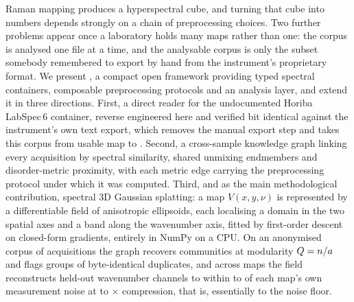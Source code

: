 Raman mapping produces a hyperspectral cube, and turning that cube into numbers
depends strongly on a chain of preprocessing choices. Two further problems
appear once a laboratory holds many maps rather than one: the corpus is
analysed one file at a time, and the analysable corpus is only the subset
somebody remembered to export by hand from the instrument's proprietary
format. We present \ramansp, a compact open framework providing typed spectral
containers, composable preprocessing protocols and an analysis layer, and
extend it in three directions. First, a direct reader for the undocumented
Horiba LabSpec\,6 container, reverse engineered here and verified bit identical
against the instrument's own text export, which removes the manual export step
and takes this corpus from \Nrawmaptext{} usable map to \Nrawmap.
Second, a cross-sample knowledge graph linking every acquisition by spectral
similarity, shared unmixing endmembers and disorder-metric proximity, with each
metric edge carrying the preprocessing protocol under which it was computed.
Third, and as the main methodological contribution, spectral 3D Gaussian
splatting: a map $V(x,y,\nu)$ is represented by a differentiable field of
anisotropic ellipsoids, each localising a domain in the two spatial axes and a
band along the wavenumber axis, fitted by first-order descent on closed-form
gradients, entirely in NumPy on a CPU. On an anonymised corpus of \Nacq{}
acquisitions the graph recovers \KGcommunities{} communities at modularity
$Q=n/a$ and flags \Ndupgroups{} groups of byte-identical
duplicates, and across \SplatNfits{} maps the field reconstructs held-out
wavenumber channels to within \SplatResidNoiseMin{} to
\SplatResidNoiseMax{} of each map's own measurement noise at
\SplatComprMin{} to \SplatComprMax$\times$ compression, that is,
essentially to the noise floor.
